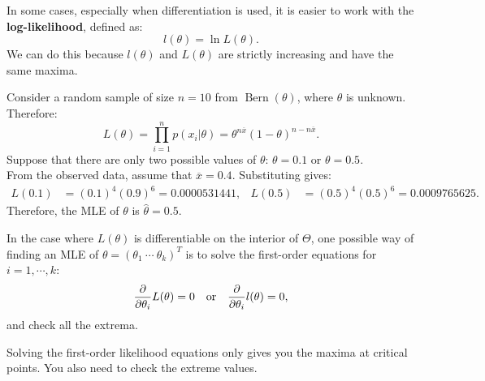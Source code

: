 \documentclass{huhtakm-template-book-v2}
\DeclareMathOperator{\Bern}{Bern}
\begin{document}
    \begin{rem}
        In some cases, especially when differentiation is used, it is easier to work with the \textbf{log-likelihood}, defined as:
        \begin{equation*}
            l(\theta) = \ln{L(\theta)}.
        \end{equation*}
        We can do this because $l(\theta)$ and $L(\theta)$ are strictly increasing and have the same maxima.
    \end{rem}
    \begin{eg}
        Consider a random sample of size $n = 10$ from $\Bern(\theta)$, where $\theta$ is unknown. Therefore:
        \begin{equation*}
            L(\theta) = \prod_{i=1}^{n} p(x_{i} | \theta) = \theta^{n\overline{x}} (1 - \theta)^{n - n\overline{x}}.
        \end{equation*}
        Suppose that there are only two possible values of $\theta$: $\theta = 0.1$ or $\theta = 0.5$.\\
        From the observed data, assume that $\overline{x} = 0.4$. Substituting gives:
        \begin{align*}
            L(0.1) &= (0.1)^{4} (0.9)^{6} = 0.0000531441, & L(0.5) &= (0.5)^{4} (0.5)^{6} = 0.0009765625.
        \end{align*}
        Therefore, the MLE of $\theta$ is $\hat{\theta} = 0.5$.
    \end{eg}
    \begin{eg}
        In the case where $L(\theta)$ is differentiable on the interior of $\Theta$, one possible way of finding an MLE of $\theta = (\theta_{1}\ \cdots\ \theta_{k})^{T}$ is to solve the first-order equations for $i = 1, \cdots, k$:
        \begin{equation*}
            \pdv*{L(\theta)}{\theta_{i}} = 0 \quad \text{or} \quad \pdv*{l(\theta)}{\theta_{i}} = 0,
        \end{equation*}
        and check all the extrema.
    \end{eg}
    \begin{rem}
        Solving the first-order likelihood equations only gives you the maxima at critical points. You also need to check the extreme values.
    \end{rem}
    \newpage
\end{document}
